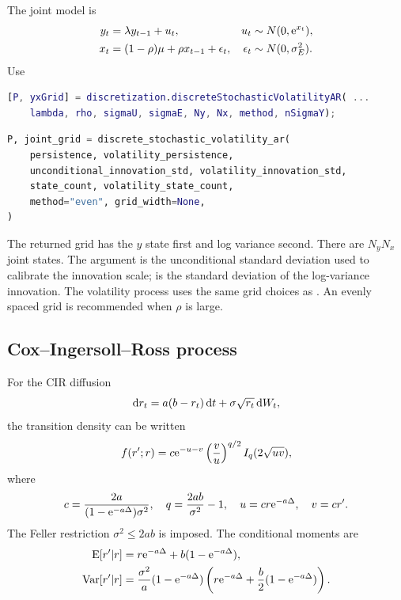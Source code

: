 The joint model is
\begin{align}
  y_t &= \lambda y_{t-1}+u_t,
  &u_t&\sim N(0,\mathrm{e}^{x_t}),\\
  x_t &= (1-\rho)\mu+\rho x_{t-1}+\epsilon_t,
  &\epsilon_t&\sim N(0,\sigma_E^2).
\end{align}
Use
\begin{lstlisting}[language=Matlab]
[P, yxGrid] = discretization.discreteStochasticVolatilityAR( ...
    lambda, rho, sigmaU, sigmaE, Ny, Nx, method, nSigmaY);
\end{lstlisting}
\begin{lstlisting}[language=Python]
P, joint_grid = discrete_stochastic_volatility_ar(
    persistence, volatility_persistence,
    unconditional_innovation_std, volatility_innovation_std,
    state_count, volatility_state_count,
    method="even", grid_width=None,
)
\end{lstlisting}
The returned grid has the $y$ state first and log variance second. There are
$N_yN_x$ joint states. The argument  is the unconditional
standard deviation used to calibrate the innovation scale;  is
the standard deviation of the log-variance innovation. The volatility process
uses the same grid choices as . An evenly spaced grid is
recommended when $\rho$ is large.

\subsection{Cox--Ingersoll--Ross process}

For the CIR diffusion
\begin{equation}
  \mathop{}\!\mathrm{d} r_t=a(b-r_t)\mathop{}\!\mathrm{d} t+\sigma\sqrt{r_t}\mathop{}\!\mathrm{d} W_t,
\end{equation}
the transition density can be written
\begin{equation}
  f(r';r)=c\mathrm{e}^{-u-v}\left(\frac{v}{u}\right)^{q/2}
  I_q(2\sqrt{uv}),
\end{equation}
where
\begin{equation*}
  c=\frac{2a}{(1-\mathrm{e}^{-a\Delta})\sigma^2},\quad
  q=\frac{2ab}{\sigma^2}-1,\quad
  u=cr\mathrm{e}^{-a\Delta},\quad v=cr'.
\end{equation*}
The Feller restriction $\sigma^2\leq 2ab$ is imposed. The conditional moments are
\begin{align*}
  \operatorname{E}\!\left[r'|r\right]&=r\mathrm{e}^{-a\Delta}+b(1-\mathrm{e}^{-a\Delta}),\\
  \operatorname{Var}\!\left[r'|r\right]&=\frac{\sigma^2}{a}(1-\mathrm{e}^{-a\Delta})
  \left(r\mathrm{e}^{-a\Delta}+\frac b2(1-\mathrm{e}^{-a\Delta})\right).
\end{align*}

